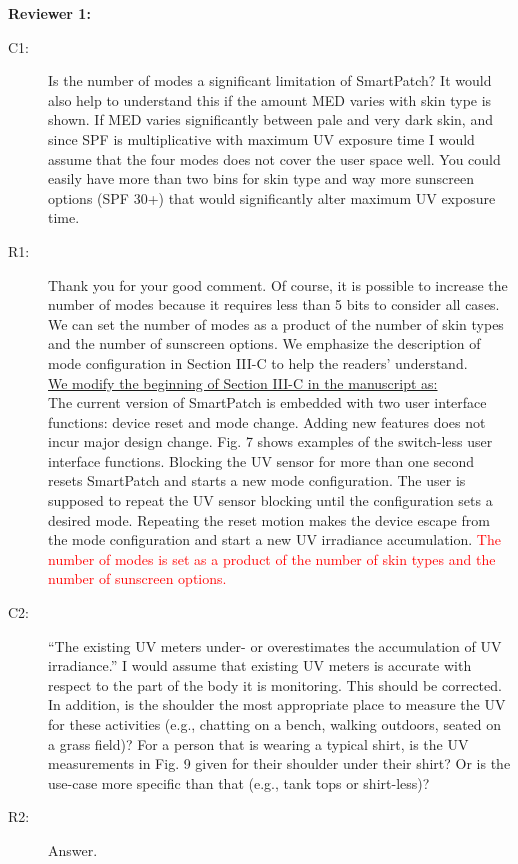 \documentclass[onecolumn]{IEEEconf}
\begin{document}
\setlength{\parindent}{0cm}
\textbf{Reviewer 1:}
\begin{description}
\item [C1: ] Is the number of modes a significant limitation of SmartPatch? It would also help to understand this if the amount MED varies with skin type is shown. If MED varies significantly between pale and very dark skin, and since SPF is multiplicative with maximum UV exposure time I would assume that the four modes does not cover the user space well. You could easily have more than two bins for skin type and way more sunscreen options (SPF 30+) that would significantly alter maximum UV exposure time.  
\item [R1: ] Thank you for your good comment. Of course, it is possible to increase the number of modes because it requires less than 5 bits to consider all cases. We can set the number of modes as a product of the number of skin types and the number of sunscreen options. We emphasize the description of mode configuration in Section III-C to help the readers’ understand.\\

\underline{We modify the beginning of Section III-C in the manuscript as:}\\
The current version of SmartPatch is embedded with two user interface functions: device reset and mode change. Adding new features does not incur major design change. Fig. 7 shows examples of the switch-less user interface functions. Blocking the UV sensor for more than one second resets SmartPatch and starts a new mode configuration. The user is supposed to repeat the UV sensor blocking until the configuration sets a desired mode. Repeating the reset motion makes the device escape from the mode configuration and start a new UV irradiance accumulation. \textcolor{red}{The number of modes is set as a product of the number of skin types and the number of sunscreen options.}
~\\

\item [C2: ] “The existing UV meters under- or overestimates the accumulation of UV irradiance.” I would assume that existing UV meters is accurate with respect to the part of the body it is monitoring. This should be corrected. In addition, is the shoulder the most appropriate place to measure the UV for these activities (e.g., chatting on a bench, walking outdoors, seated on a grass field)? For a person that is wearing a typical shirt, is the UV measurements in Fig. 9 given for their shoulder under their shirt? Or is the use-case more specific than that (e.g., tank tops or shirt-less)?
\item [R2: ] Answer.
~\\


\end{description}
\end{document}
